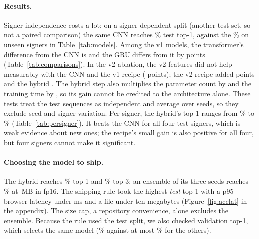 \paragraph{Results.}
Signer independence costs a lot: on a signer-dependent split (another test set, so not a
paired comparison) the same CNN reaches \% test top-1, against the
\% on unseen signers in Table~\ref{tab:models}. Among the v1 models, the transformer's difference from the CNN is
 and the GRU differs from it by  points (Table~\ref{tab:comparisons}). In the
v2 ablation, the v2 features did not help measurably with the CNN and the v1 recipe
( points); the v2 recipe added  points and the hybrid
. The hybrid step also multiplies the parameter count by  and the
training time by , so its gain cannot be credited to the architecture alone. These
tests treat the  test sequences as independent and average over seeds, so they exclude
seed and signer variation. Per signer, the hybrid's top-1 ranges from \% to
\% (Table~\ref{tab:persigner}). It beats the CNN for all four test signers, which is
weak evidence about new ones; the recipe's small gain is also positive for all four, but four
signers cannot make it significant.

\paragraph{Choosing the model to ship.}
The hybrid reaches \% top-1 and \% top-3; an ensemble of its three seeds reaches
\% at \,MB in fp16. The shipping rule took the highest \emph{test}
top-1 with a p95 browser latency under  ms and a file under ten megabytes
(Figure~\ref{fig:acclat} in the appendix). The size cap, a repository convenience, alone excludes
the ensemble. Because the rule used the test split, we also checked validation top-1, which selects
the same model (\% against at most \% for the others).




